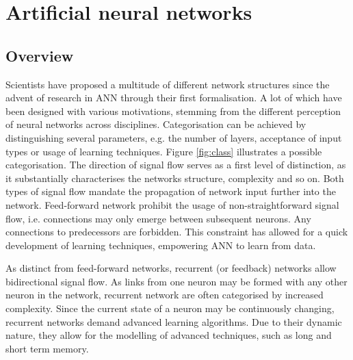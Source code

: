\documentclass[10pt,a4paper,DIV=11]{scrreprt}
\begin{document}
\chapter{Artificial neural networks}
\section{Overview}

Scientists have proposed a multitude of different network structures since the advent of research in ANN through their first formalisation. 
A lot of which have been designed with various motivations, stemming from the different perception of neural networks across disciplines.
Categorisation can be achieved by distinguishing several parameters, e.g. the number of layers, acceptance of input types or usage of learning techniques.
Figure \ref{fig:class} illustrates a possible categorisation\cite{NNGER}.
The direction of signal flow serves as a first level of distinction, as it substantially characterises the networks structure, complexity and so on.
Both types of signal flow mandate the propagation of network input further into the network.
Feed-forward network prohibit the usage of non-straightforward signal flow, i.e. connections may only emerge between subsequent neurons.
Any connections to predecessors are forbidden. This constraint has allowed for a quick development of learning techniques, empowering ANN to learn from data. 

As distinct from feed-forward networks, recurrent (or feedback) networks allow bidirectional signal flow. 
As links from one neuron may be formed with any other neuron in the network, recurrent network are often categorised by increased complexity.
Since the current state of a neuron may be continuously changing, recurrent networks demand advanced learning algorithms.
Due to their dynamic nature, they allow for the modelling of advanced techniques, such as long and short term memory.
\end{document}
